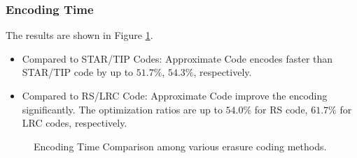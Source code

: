 \documentclass[sigconf]{acmart}
\begin{document}
\subsubsection{Encoding Time}
The results are shown in Figure \ref{fig-encoding}.
\begin{itemize}
    \item Compared to STAR/TIP Codes: Approximate Code encodes faster than STAR/TIP code by up to $51.7\%$, $54.3\%$, respectively. 
    


    \item Compared to RS/LRC Code: Approximate Code improve the encoding significantly. The optimization ratios are up to $54.0\%$ for RS code,  $61.7\%$ for LRC codes, respectively.
    

\end{itemize}


\begin{figure}[ht]
\vspace{-0.3cm}
\caption{Encoding Time Comparison among various erasure coding methods.}\label{fig-encoding}
\end{figure}
\end{document}
